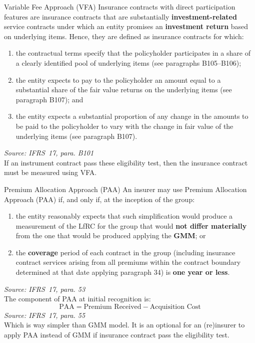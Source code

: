\documentclass[aspectratio=169]{beamer}
\begin{document}
\begin{frame}{Variable Fee Approach (VFA)}
Insurance contracts with direct participation features are insurance contracts that are substantially \textbf{investment-related} service contracts under which an entity promises an \textbf{investment return} based on underlying items. Hence, they
are defined as insurance contracts for which:
\begin{enumerate}
	\item the contractual terms specify that the policyholder participates in a
	share of a clearly identified pool of underlying items (see paragraphs
	B105–B106);
	\item the entity expects to pay to the policyholder an amount equal to a
	substantial share of the fair value returns on the underlying items (see
	paragraph B107); and
	\item the entity expects a substantial proportion of any change in the
	amounts to be paid to the policyholder to vary with the change in fair
	value of the underlying items (see paragraph B107).
\end{enumerate}
  \footnotesize
\textit{Source: IFRS~17, para. B101}\\
\vspace{0.4em}
\normalsize
If an instrument contract pass these eligibility test, then the insurance contract must be measured using VFA.
\end{frame}

\begin{frame}[allowframebreaks]{Premium Allocation Approach (PAA)}
An insurer may use Premium Allocation Approach (PAA) if, and only if, at the inception of the group:
\begin{enumerate}
\item the entity reasonably expects that such simplification would produce a  measurement of the LfRC for the group that would \textbf{not differ materially} from the one that would be produced applying the \textbf{GMM}; or
\item the \textbf{coverage} period of each contract in the group (including insurance contract services arising from all premiums within the contract boundary determined at that date applying paragraph 34) is \textbf{one year or less}.
\end{enumerate}
  \vspace{0.2em}
  \footnotesize
  \textit{Source: IFRS~17, para. 53}\\
  \vspace{0.4em}
  \normalsize
The component of PAA at initial recognition is:
\begin{equation}
\text{PAA} = \text{Premium Received} - \text{Acquisition Cost}
\end{equation}
  \vspace{0.2em}
  \footnotesize
  \textit{Source: IFRS~17, para. 55}\\
  \vspace{0.4em}
  \normalsize
  Which is way simpler than GMM model. It is an optional for an (re)insurer to apply PAA instead of GMM if insurance contract pass the eligibility test.
\end{frame}
\end{document}
